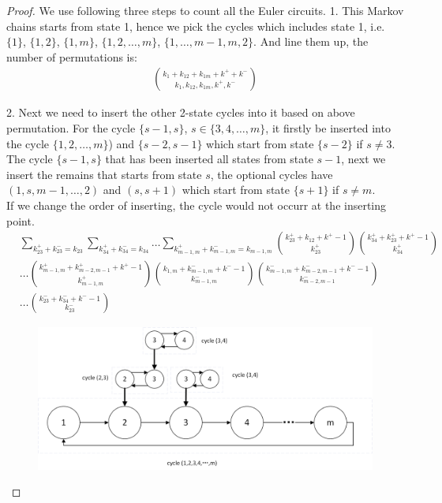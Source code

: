 \documentclass[11pt,en,cite=authoryear]{elegantpaper}
\begin{document}
\begin{proof}
    We use following three steps to count all the Euler circuits.
    1. This Markov chains starts from state 1, hence we pick the cycles which includes state 1, i.e. $\{1\}$, $\{1, 2\}$, $\{1, m\}$, $\{1, 2, \dots, m\}$, $\{1, \dots, m-1,m, 2\}$. And line them up, the number of permutations is:
    \begin{align*}
        \binom{k_{1}+k_{12}+k_{1m}+k^{+}+k^{-}}{k_{1}, k_{12}, k_{1m}, k^{+}, k^{-}}
    \end{align*}
    
    2. Next we need to insert the other 2-state cycles into it based on above permutation.
    For the cycle $\{s-1, s\}$, $s \in \{3, 4, \dots , m\}$, it firstly be inserted into the cycle $\{1, 2, \dots, m\}$) and $\{s-2, s-1\}$ which start from state $\{s-2\}$ if $s \neq 3$.
    The cycle $\{s-1, s\}$ that has been inserted all states from state $s-1$, next we insert the remains that starts from state $s$, the optional cycles have $(1, s, m-1, \dots, 2)$ and $(s, s+1)$ which start from state $\{s+1\}$ if $s \neq m$. \\
    If we change the order of inserting, the cycle would not occurr at the inserting point.
    \begin{align*}
        &\sum_{k_{23}^{+}+k_{23}^{-}=k_{23}} \sum_{k_{34}^{+}+k_{34}^{-}=k_{34}}
        \dots \sum_{k_{m-1,m}^{+}+k_{m-1,m}^{-}=k_{m-1,m}}
        \binom{k_{23}^{+}+k_{12}+k^{+}-1}{k_{23}^{+}} \binom{k_{34}^{+}+k_{23}^{+}+k^{+}-1}{k_{34}^{+}} \\
        &\dots \binom{k_{m-1, m}^{+}+ k^{+}_{m-2, m-1} + k^{+}  -1}{k_{m-1, m}^{+}} \binom{k_{1, m} + k_{m-1, m}^{-} + k^{-} -1}{k_{m-1, m}^{-}} \binom{k_{m-1, m}^{-} + k_{m-2, m-1}^{-} + k^{-} - 1}{k_{m-2, m-1}^{-}} \\
        &\dots \binom{k_{23}^{-} + k_{34}^{-} + k^{-} - 1}{k_{23}^{-}}
    \end{align*}
    \begin{figure}[h]
        \centering
        \includegraphics[scale=0.5]{insert1.png}

\end{figure}
\end{proof}
\end{document}
